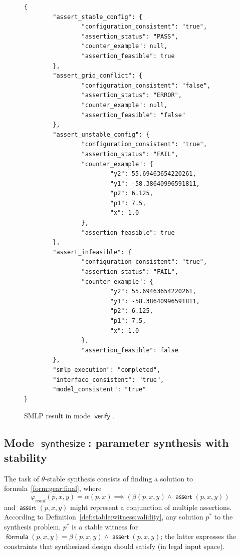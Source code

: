 \documentclass[a4paper,parskip=half]{article} %
\newcommand*\eqdef=
\newcommand*\query{\operatorname{\mathsf{query}}}
\newcommand*\assert{\operatorname{\mathsf{assert}}}
\newcommand*\formula{\operatorname{\mathsf{formula}}}
\newcommand*\mode[1]{\operatorname{\mathsf{#1}}} %
\begin{document}
\begin{figure}[tp]%
\small
\begin{verbatim}
{
        "assert_stable_config": {
                "configuration_consistent": "true",
                "assertion_status": "PASS",
                "counter_example": null,
                "assertion_feasible": true
        },
        "assert_grid_conflict": {
                "configuration_consistent": "false",
                "assertion_status": "ERROR",
                "counter_example": null,
                "assertion_feasible": "false"
        },
        "assert_unstable_config": {
                "configuration_consistent": "true",
                "assertion_status": "FAIL",
                "counter_example": {
                        "y2": 55.69463654220261,
                        "y1": -58.38640996591811,
                        "p2": 6.125,
                        "p1": 7.5,
                        "x": 1.0
                },
                "assertion_feasible": true
        },
        "assert_infeasible": {
                "configuration_consistent": "true",
                "assertion_status": "FAIL",
                "counter_example": {
                        "y2": 55.69463654220261,
                        "y1": -58.38640996591811,
                        "p2": 6.125,
                        "p1": 7.5,
                        "x": 1.0
                },
                "assertion_feasible": false
        },
        "smlp_execution": "completed",
        "interface_consistent": "true",
        "model_consistent": "true"
}
\end{verbatim}
\caption{SMLP result in mode $\mode{verify}$.}
\label{fig:verify:result}
\end{figure}





\subsection{Mode $\mode{synthesize}$: parameter synthesis with stability}


The task of $\theta$-stable synthesis consists of finding a solution to formula~\cref{form:gear:final}, where
\[\varphi_{\mathit{cond}}(p,x,y) \eqdef \alpha(p,x) \implies (\beta(p, x, y) \wedge \assert(p,x,y))\]
and  $\assert(p, x, y)$ might represent a conjunction of multiple assertions.
According to Definition~\ref{def:stable:witness:validity}, any solution $p^*$ to the synthesis problem,  
$p^*$  is a stable witness for $\formula(p, x, y) \eqdef \beta(p, x, y) \wedge \assert(p,x,y)$; the latter
expresses the constraints that synthesized design should satisfy (in legal input space).
\end{document}
